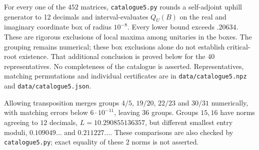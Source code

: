 \documentclass[11pt,a4paper]{article}
\begin{document}
For every one of the $452$ matrices, \texttt{catalogue5.py} rounds a
self-adjoint uphill generator to 12 decimals and interval-evaluates
$Q_U(B)$ on the real and imaginary coordinate box of radius $10^{-8}$.
Every lower bound exceeds $.20634$. These are rigorous exclusions of
local maxima among unitaries in the boxes. The grouping remains
numerical; these box exclusions alone do not establish critical-root
existence. That additional conclusion is proved below for the $40$
representatives. No completeness of the catalogue is asserted.
Representatives, matching
permutations and individual certificates are in \texttt{data/catalogue5.npz}
and \texttt{data/catalogue5.json}.

Allowing transposition merges groups $4/5$, $19/20$, $22/23$ and $30/31$
numerically, with matching errors below $6\cdot10^{-11}$, leaving $36$
groups. Groups $15,16$ have norms agreeing to $12$ decimals,
$L=10.290855136357$, but different smallest entry moduli,
$0.109049\ldots$ and $0.211227\ldots$. These comparisons are also
checked by \texttt{catalogue5.py}; exact equality of these 2 norms is not asserted.
\end{document}
